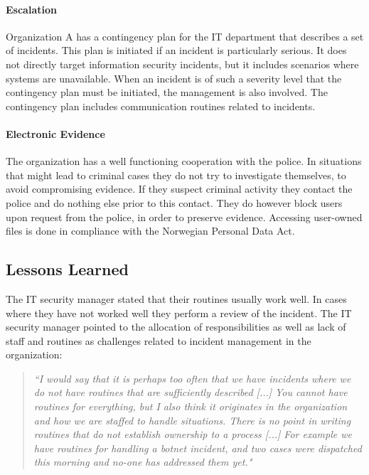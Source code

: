 \paragraph{Escalation}
Organization A has a contingency plan for the IT department that describes a set of incidents. This plan is initiated if an incident is particularly serious. It does not directly target information security incidents, but it includes scenarios where systems are unavailable. When an incident is of such a severity level that the contingency plan must be initiated, the management is also involved. The contingency plan includes communication routines related to incidents. 

\paragraph{Electronic Evidence}
The organization has a well functioning cooperation with the police. In situations that might lead to criminal cases they do not try to investigate themselves, to avoid compromising evidence. If they suspect criminal activity they contact the police and do nothing else prior to this contact. They do however block users upon request from the police, in order to preserve evidence. Accessing user-owned files is done in compliance with the Norwegian Personal Data Act.

\subsection{Lessons Learned}
The IT security manager stated that their routines usually work well. In cases where they have not worked well they perform a review of the incident. The IT security manager pointed to the allocation of responsibilities as well as lack of staff and routines as challenges related to incident management in the organization: 

\begin{quote}
\textit{``I would say that it is perhaps too often that we have incidents where we do not have routines that are sufficiently described [...] You cannot have routines for everything, but I also think it originates in the organization and how we are staffed to handle situations. There is no point in writing routines that do not establish ownership to a process [...] For example we have routines for handling a botnet incident, and two cases were dispatched this morning and no-one has addressed them yet."}
\end{quote}

